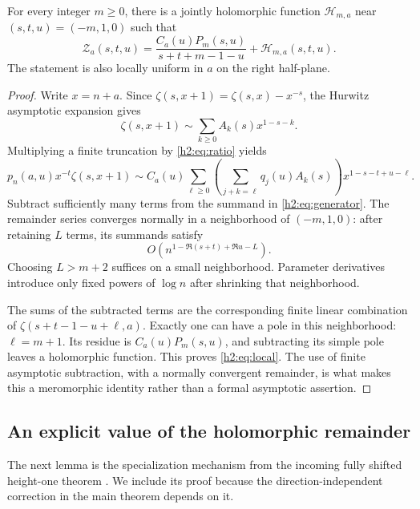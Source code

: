 \begin{proposition}
\label{h2:prop:local}
For every integer $m\ge0$, there is a jointly holomorphic function
$\mathcal H_{m,a}$ near $(s,t,u)=(-m,1,0)$ such that
\begin{equation}\label{h2:eq:local}
 \mathcal Z_a(s,t,u)=
 \frac{C_a(u)P_m(s,u)}{s+t+m-1-u}+\mathcal H_{m,a}(s,t,u).
\end{equation}
The statement is also locally uniform in $a$ on the right half-plane.
\end{proposition}
\begin{proof}
Write $x=n+a$. Since
$\zeta(s,x+1)=\zeta(s,x)-x^{-s}$, the Hurwitz asymptotic expansion
\cite{DLMFHzeta} gives
\[
 \zeta(s,x+1)\sim\sum_{k\ge0}A_k(s)x^{1-s-k}.
\]
Multiplying a finite truncation by \eqref{h2:eq:ratio} yields
\[
 p_n(a,u)x^{-t}\zeta(s,x+1)
 \sim C_a(u)\sum_{\ell\ge0}
   \left(\sum_{j+k=\ell}q_j(u)A_k(s)\right)
                         x^{1-s-t+u-\ell}.
\]
Subtract sufficiently many terms from the summand in
\eqref{h2:eq:generator}. The remainder series converges normally in a
neighborhood of $(-m,1,0)$: after retaining $L$ terms, its
summands satisfy
\[
 O(n^{1-\Re(s+t)+\Re u-L}).
\]
Choosing $L>m+2$ suffices on a small neighborhood. Parameter derivatives introduce only fixed powers
of $\log n$ after shrinking that neighborhood.

The sums of the subtracted terms are the corresponding finite linear
combination of
$\zeta(s+t-1-u+\ell,a)$. Exactly one can have a pole in this
neighborhood: $\ell=m+1$. Its residue is
$C_a(u)P_m(s,u)$, and subtracting its simple pole leaves a holomorphic
function. This proves \eqref{h2:eq:local}. The use of finite asymptotic
subtraction, with a normally convergent remainder, is what makes this a
meromorphic identity rather than a formal asymptotic assertion.
\end{proof}

\subsection{An explicit value of the holomorphic remainder}

The next lemma is the specialization mechanism from the incoming
fully shifted height-one theorem \cite{IncomingExact}. We include its
proof because the direction-independent correction in the main theorem
depends on it.

